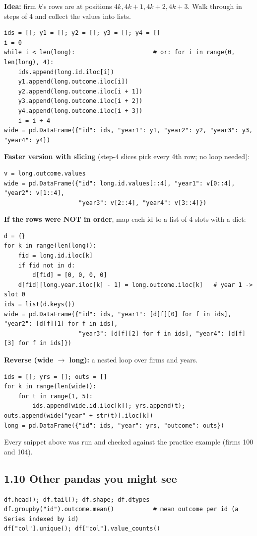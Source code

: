 \documentclass[10pt]{article}
\begin{document}
\textbf{Idea:} firm $k$'s rows are at positions $4k, 4k+1, 4k+2, 4k+3$. Walk through in steps of 4 and collect the values into lists.
\begin{lstlisting}
ids = []; y1 = []; y2 = []; y3 = []; y4 = []
i = 0
while i < len(long):                      # or: for i in range(0, len(long), 4):
    ids.append(long.id.iloc[i])
    y1.append(long.outcome.iloc[i])
    y2.append(long.outcome.iloc[i + 1])
    y3.append(long.outcome.iloc[i + 2])
    y4.append(long.outcome.iloc[i + 3])
    i = i + 4
wide = pd.DataFrame({"id": ids, "year1": y1, "year2": y2, "year3": y3, "year4": y4})
\end{lstlisting}
\textbf{Faster version with slicing} (step-4 slices pick every 4th row; no loop needed):
\begin{lstlisting}
v = long.outcome.values
wide = pd.DataFrame({"id": long.id.values[::4], "year1": v[0::4], "year2": v[1::4],
                     "year3": v[2::4], "year4": v[3::4]})
\end{lstlisting}
\textbf{If the rows were NOT in order}, map each id to a list of 4 slots with a dict:
\begin{lstlisting}
d = {}
for k in range(len(long)):
    fid = long.id.iloc[k]
    if fid not in d:
        d[fid] = [0, 0, 0, 0]
    d[fid][long.year.iloc[k] - 1] = long.outcome.iloc[k]   # year 1 -> slot 0
ids = list(d.keys())
wide = pd.DataFrame({"id": ids, "year1": [d[f][0] for f in ids], "year2": [d[f][1] for f in ids],
                     "year3": [d[f][2] for f in ids], "year4": [d[f][3] for f in ids]})
\end{lstlisting}
\textbf{Reverse (wide $\to$ long):} a nested loop over firms and years.
\begin{lstlisting}
ids = []; yrs = []; outs = []
for k in range(len(wide)):
    for t in range(1, 5):
        ids.append(wide.id.iloc[k]); yrs.append(t); outs.append(wide["year" + str(t)].iloc[k])
long = pd.DataFrame({"id": ids, "year": yrs, "outcome": outs})
\end{lstlisting}
Every snippet above was run and checked against the practice example (firms 100 and 104).

\subsection*{1.10 Other pandas you might see}
\begin{lstlisting}
df.head(); df.tail(); df.shape; df.dtypes
df.groupby("id").outcome.mean()           # mean outcome per id (a Series indexed by id)
df["col"].unique(); df["col"].value_counts()
\end{lstlisting}
\end{document}
